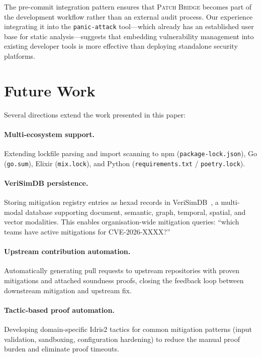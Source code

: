 \documentclass[11pt,twocolumn]{article}
\begin{document}
The pre-commit integration pattern ensures that \textsc{Patch Bridge}
becomes part of the development workflow rather than an external audit
process. Our experience integrating it into the \texttt{panic-attack}
tool---which already has an established user base for static
analysis---suggests that embedding vulnerability management into
existing developer tools is more effective than deploying standalone
security platforms.

\section{Future Work}
\label{sec:future}

Several directions extend the work presented in this paper:

\paragraph{Multi-ecosystem support.} Extending lockfile parsing and
import scanning to npm (\texttt{package-lock.json}), Go
(\texttt{go.sum}), Elixir (\texttt{mix.lock}), and Python
(\texttt{requirements.txt} / \texttt{poetry.lock}).

\paragraph{VeriSimDB persistence.} Storing mitigation registry
entries as hexad records in VeriSimDB~\cite{verisimdb}, a multi-modal
database supporting document, semantic, graph, temporal, spatial, and
vector modalities. This enables organisation-wide mitigation queries:
``which teams have active mitigations for CVE-2026-XXXX?''

\paragraph{Upstream contribution automation.} Automatically generating
pull requests to upstream repositories with proven mitigations and
attached soundness proofs, closing the feedback loop between downstream
mitigation and upstream fix.

\paragraph{Tactic-based proof automation.} Developing domain-specific
Idris2 tactics for common mitigation patterns (input validation,
sandboxing, configuration hardening) to reduce the manual proof burden
and eliminate proof timeouts.
\end{document}
